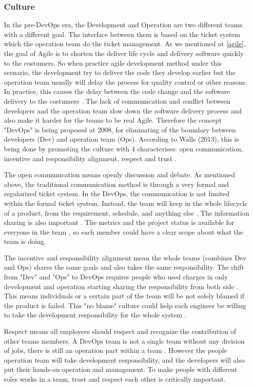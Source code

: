 \subsubsection[]{Culture}
In the pre-DevOps era, the Development and Operation are two different teams with a different goal. The interface between them is based on the ticket system which the operation team do the ticket management. As we mentioned at \ref{agile}, the goal of Agile is to shorten the deliver life cycle and delivery software quickly to the costumers. So when practice agile development method under this scenario, the development try to deliver the code they develop earlier but the operation team usually will delay the process for quality control or other reasons. In practice, this causes the delay between the code change and the software delivery to the costumers \cite{leite2019survey}. 
The lack of communication and conflict between developers and the operation team slow down the software delivery process and also make it harder for the teams to be real Agile. Therefore the concept "DevOps" is being proposed at 2008, for eliminating of the boundary between developers (Dev) and operation team (Ops). According to Walls (2013), this is being done by promoting the culture with 4 characterises: open communication, incentive and responsibility alignment, respect and trust \cite{walls2013building}.
\par 
The open communication means openly discussion and debate. As mentioned above, the traditional communication method is through a very formal and regularized ticket system. In the DevOps, the communication is not limited within the formal ticket system. Instead, the team will keep in the whole lifecycle of a product, from the requirement, schedule, and anything else \cite{walls2013building}. The information sharing is also important \cite{lwakatare2015dimensions}. The metrics and the project status is available for everyone in the team \label{moniter}, so each member could have a clear scope about what the team is doing.
\par
The incentive and responsibility alignment mean the whole teams (combines Dev and Ops) shares the same goals and also takes the same responsibility. The shift from "Dev" and "Ops" to DevOps requires people who used charges in only development and operation starting sharing the responsibility from both side \cite{lwakatare2015dimensions}. This means individuals or a certain part of the team will be not solely blamed if the product is failed. This "no blame" culture could help each engineer be willing to take the development responsibility for the whole system \cite{feitelson2013development}.
\par 
Respect means all employees should respect and recognize the contribution of other teams members. A DevOps team is not a single team without any division of jobs, there is still an operation part within a team \cite{TheresNo86:online}. However the people operation team will take development responsibility, and the developers will also put their hands-on operation and management\cite{shropshire2017uncertainty}. To make people with different roles works in a team, trust and respect each other is critically important. 
